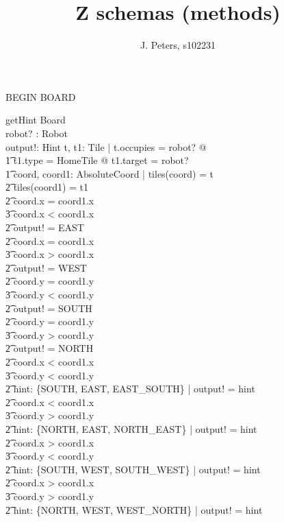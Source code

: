 \documentclass[a4paper,11pt]{article}
\begin{document}
\title{Z schemas (methods)}
\author{J. Peters, s102231}
\maketitle


BEGIN BOARD
\begin{schema}{getHint}
\Xi Board \\
robot? : Robot \\
output!: Hint
\where
\exists t, t1: Tile | t.occupies = robot? @\\ \t1
t1.type = HomeTile @ t1.target = robot? \\ \t1
\exists coord, coord1: AbsoluteCoord | tiles(coord) = t \\ \t2
tiles(coord1) = t1 \\ \t2
\IF coord.x = coord1.x \\ \t3
coord.x < coord1.x \\ \t2
\THEN output! = EAST \\ \t2
\IF coord.x = coord1.x \\ \t3
coord.x > coord1.x \\ \t2
\THEN output! = WEST \\ \t2
\IF coord.y = coord1.y \\ \t3
coord.y < coord1.y \\ \t2
\THEN output! = SOUTH \\ \t2
\IF coord.y = coord1.y \\ \t3
coord.y > coord1.y \\ \t2
\THEN output! = NORTH \\ \t2
\IF coord.x < coord1.x \\ \t3
coord.y < coord1.y \\ \t2
\THEN \exists hint: \{SOUTH, EAST, EAST\_SOUTH\} | output! = hint \\ \t2
\IF coord.x < coord1.x \\ \t3
coord.y > coord1.y \\ \t2
\THEN \exists hint: \{NORTH, EAST, NORTH\_EAST\} | output! = hint \\ \t2
\IF coord.x > coord1.x \\ \t3
coord.y < coord1.y \\ \t2
\THEN \exists hint: \{SOUTH, WEST, SOUTH\_WEST\} | output! = hint \\ \t2
\IF coord.x > coord1.x \\ \t3
coord.y > coord1.y \\ \t2
\THEN \exists hint: \{NORTH, WEST, WEST\_NORTH\} | output! = hint
\end{schema}
\end{document}
